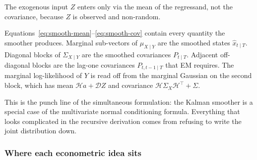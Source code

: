 \documentclass[11pt]{article}
\begin{document}
The exogenous input $Z$ enters only via the mean of the regressand,
not the covariance, because $Z$ is observed and non-random.

Equations~\eqref{eq:smooth-mean}--\eqref{eq:smooth-cov} contain every
quantity the smoother produces.  Marginal sub-vectors of $\mu_{X\mid Y}$
are the smoothed states $\widehat x_{t\mid T}$.  Diagonal blocks of
$\Sigma_{X\mid Y}$ are the smoothed covariances $P_{t\mid T}$.  Adjacent
off-diagonal blocks are the lag-one covariances $P_{t,t-1\mid T}$ that
EM requires.  The marginal log-likelihood of $Y$ is read off from
the marginal Gaussian on the second block, which has mean $\mathcal Ha+\mathcal D Z$
and covariance $\mathcal H\Sigma_X\mathcal H^\top+\Sigma$.

This is the punch line of the simultaneous formulation: the Kalman
smoother is a special case of the multivariate normal conditioning
formula.  Everything that looks complicated in the recursive derivation
comes from refusing to write the joint distribution down.

\subsubsection{Where each econometric idea sits}
\end{document}
